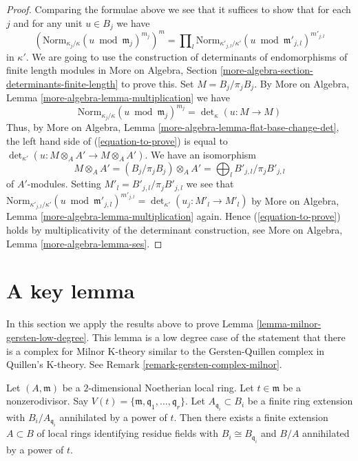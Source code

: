 \begin{proof}
\medskip\noindent
Comparing the formulae above we see that it suffices to show that
for each $j$ and for any unit $u \in B_j$ we have
\begin{equation}
\label{equation-to-prove}
\left(\text{Norm}_{\kappa_j/\kappa}(u \bmod \mathfrak m_j)^{m_j}\right)^m
=
\prod\nolimits_l
\text{Norm}_{\kappa'_{j, l}/\kappa'}(u \bmod \mathfrak m'_{j, l})^{m'_{j, l}}
\end{equation}
in $\kappa'$. We are going to use the construction of determinants of
endomorphisms of finite length modules in
More on Algebra, Section \ref{more-algebra-section-determinants-finite-length}
to prove this. Set $M = B_j/\pi_j B_j$. By
More on Algebra, Lemma \ref{more-algebra-lemma-multiplication} we have
$$
\text{Norm}_{\kappa_j/\kappa}(u \bmod \mathfrak m_j)^{m_j} =
\det\nolimits_\kappa(u : M \to M)
$$
Thus, by
More on Algebra, Lemma \ref{more-algebra-lemma-flat-base-change-det},
the left hand side of (\ref{equation-to-prove}) is equal to
$\det_{\kappa'}(u : M \otimes_A A' \to M \otimes_A A')$.
We have an isomorphism
$$
M \otimes_A A' = (B_j/\pi_j B_j) \otimes_A A' =
\bigoplus\nolimits_l B'_{j, l}/\pi_j B'_{j, l}
$$
of $A'$-modules. Setting $M'_l = B'_{j, l}/\pi_j B'_{j, l}$ we see that
$\text{Norm}_{\kappa'_{j, l}/\kappa'}(u \bmod \mathfrak m'_{j, l})^{m'_{j, l}}
= \det_{\kappa'}(u_j : M'_l \to M'_l)$ by
More on Algebra, Lemma \ref{more-algebra-lemma-multiplication} again.
Hence (\ref{equation-to-prove}) holds by multiplicativity of the determinant
construction, see More on Algebra, Lemma \ref{more-algebra-lemma-ses}.
\end{proof}






\section{A key lemma}
\label{section-key-lemma}

\noindent
In this section we apply the results above to prove
Lemma \ref{lemma-milnor-gersten-low-degree}.
This lemma is a low degree case of the statement
that there is a complex for Milnor K-theory similar
to the Gersten-Quillen complex in Quillen's K-theory.
See Remark \ref{remark-gersten-complex-milnor}.

\begin{lemma}
\label{lemma-perpare-key}
Let $(A, \mathfrak m)$ be a $2$-dimensional Noetherian local ring.
Let $t \in \mathfrak m$ be a nonzerodivisor. Say
$V(t) = \{\mathfrak m, \mathfrak q_1, \ldots, \mathfrak q_r\}$.
Let $A_{\mathfrak q_i} \subset B_i$ be a finite ring
extension with $B_i/A_{\mathfrak q_i}$ annihilated by a power of
$t$. Then there exists a finite extension $A \subset B$ of
local rings identifying residue fields
with $B_i \cong B_{\mathfrak q_i}$ and $B/A$ annihilated
by a power of $t$.
\end{lemma}

